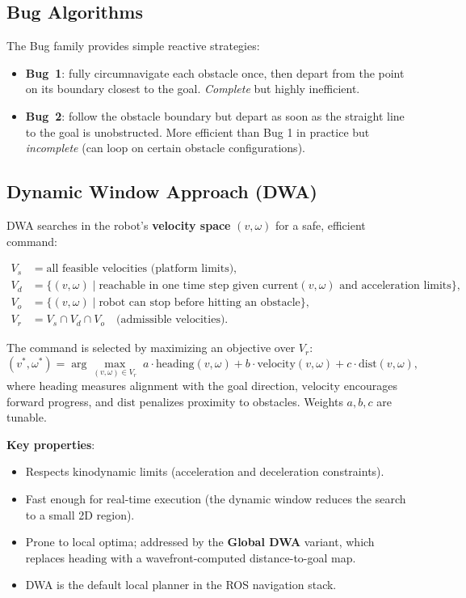 \documentclass[11pt,a4paper]{article}
\theoremstyle{definition}
\theoremstyle{plain}
\theoremstyle{remark}
\begin{document}
\subsection{Bug Algorithms}

The Bug family provides simple reactive strategies:
\begin{itemize}
    \item \textbf{Bug~1}: fully circumnavigate each obstacle once, then depart from the point on its boundary closest to the goal. \emph{Complete} but highly inefficient. %
    \item \textbf{Bug~2}: follow the obstacle boundary but depart as soon as the straight line to the goal is unobstructed. More efficient than Bug 1 in practice but \emph{incomplete} (can loop on certain obstacle configurations).
\end{itemize}

\subsection{Dynamic Window Approach (DWA)}

DWA searches in the robot's \textbf{velocity space} $(v, \omega)$ for a safe, efficient command:

\begin{tcolorbox}[colback=blue!5!white,colframe=blue!75!black,title=\textbf{DWA Velocity Space}]
\begin{align*}
    V_s &= \text{all feasible velocities (platform limits)}, \\
    V_d &= \{(v, \omega) \mid \text{reachable in one time step given current} (v, \omega) \text{ and acceleration limits}\}, \\
    V_o &= \{(v, \omega) \mid \text{robot can stop before hitting an obstacle}\}, \\
    V_r &= V_s \cap V_d \cap V_o \quad \text{(admissible velocities)}.
\end{align*}
\end{tcolorbox}

The command is selected by maximizing an objective over $V_r$:
\[
    (v^*, \omega^*) = \arg\max_{(v,\omega) \in V_r}\; a \cdot \mathrm{heading}(v,\omega) + b \cdot \mathrm{velocity}(v,\omega) + c \cdot \mathrm{dist}(v,\omega),
\]
where $\mathrm{heading}$ measures alignment with the goal direction, $\mathrm{velocity}$ encourages forward progress, and $\mathrm{dist}$ penalizes proximity to obstacles. Weights $a, b, c$ are tunable.

\textbf{Key properties}:
\begin{itemize}
    \item Respects kinodynamic limits (acceleration and deceleration constraints).
    \item Fast enough for real-time execution (the dynamic window reduces the search to a small 2D region).
    \item Prone to local optima; addressed by the \textbf{Global DWA} variant, which replaces $\mathrm{heading}$ with a wavefront-computed distance-to-goal map.
    \item DWA is the default local planner in the ROS navigation stack.
\end{itemize}
\end{document}
